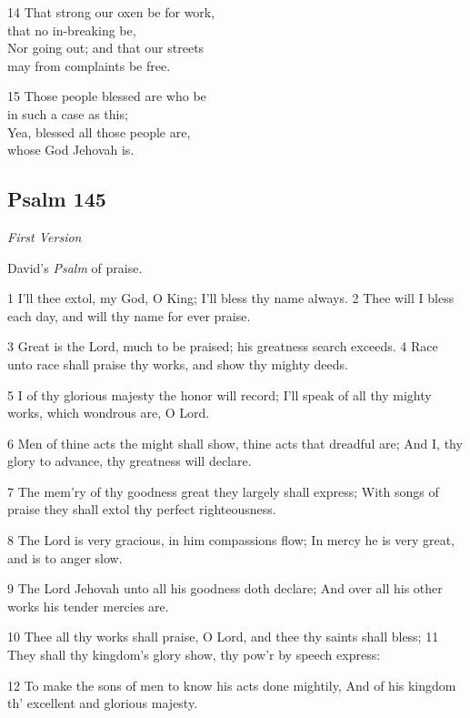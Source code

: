 14 That strong our oxen be for work,\\
that no in-breaking be,\\
Nor going out; and that our streets\\
may from complaints be free.

15 Those people blessed are who be\\
in such a case as this;\\
Yea, blessed all those people are,\\
whose God Jehovah is.

\begin{center}
\quad{}\quad{}
\end{center}

\subsection*{Psalm 145}

\emph{First Version}

David’s \emph{Psalm} of praise.

1 I’ll thee extol, my God, O King;
I’ll bless thy name always.
2 Thee will I bless each day, and will
thy name for ever praise.

3 Great is the Lord, much to be praised;
his greatness search exceeds.
4 Race unto race shall praise thy works,
and show thy mighty deeds.

5 I of thy glorious majesty
the honor will record;
I’ll speak of all thy mighty works,
which wondrous are, O Lord.

6 Men of thine acts the might shall show,
thine acts that dreadful are;
And I, thy glory to advance,
thy greatness will declare.

7 The mem’ry of thy goodness great
they largely shall express;
With songs of praise they shall extol
thy perfect righteousness.

8 The Lord is very gracious,
in him compassions flow;
In mercy he is very great,
and is to anger slow.

9 The Lord Jehovah unto all
his goodness doth declare;
And over all his other works
his tender mercies are.

10 Thee all thy works shall praise, O Lord,
and thee thy saints shall bless;
11 They shall thy kingdom’s glory show,
thy pow’r by speech express:

12 To make the sons of men to know
his acts done mightily,
And of his kingdom th’ excellent
and glorious majesty.


